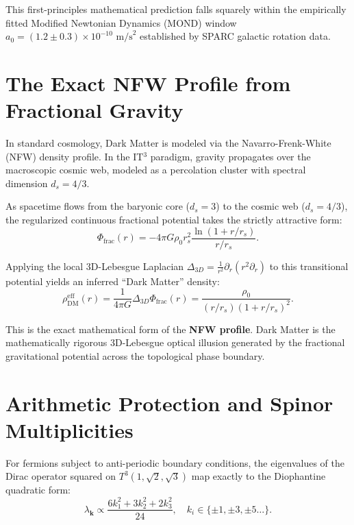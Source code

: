 \documentclass[12pt, a4paper]{article}
\begin{document}
This first-principles mathematical prediction falls squarely within the empirically fitted Modified Newtonian Dynamics (MOND) window $a_0 = (1.2 \pm 0.3) \times 10^{-10} \text{ m/s}^2$ established by SPARC galactic rotation data. 

\section{The Exact NFW Profile from Fractional Gravity}

In standard cosmology, Dark Matter is modeled via the Navarro-Frenk-White (NFW) density profile. In the IT$^3$ paradigm, gravity propagates over the macroscopic cosmic web, modeled as a percolation cluster with spectral dimension $d_s = 4/3$. 

As spacetime flows from the baryonic core ($d_s=3$) to the cosmic web ($d_s=4/3$), the regularized continuous fractional potential takes the strictly attractive form:
\begin{equation}
\Phi_{\text{frac}}(r) = -4\pi G \rho_0 r_s^2 \frac{\ln(1 + r/r_s)}{r/r_s}.
\end{equation}

Applying the local 3D-Lebesgue Laplacian $\Delta_{3D} = \frac{1}{r^2} \partial_r (r^2 \partial_r)$ to this transitional potential yields an inferred ``Dark Matter'' density:
\begin{equation}
\rho_{\text{DM}}^{\text{eff}}(r) = \frac{1}{4\pi G} \Delta_{3D} \Phi_{\text{frac}}(r) = \frac{\rho_0}{(r/r_s)(1 + r/r_s)^2}.
\end{equation}

This is the exact mathematical form of the \textbf{NFW profile}. Dark Matter is the mathematically rigorous 3D-Lebesgue optical illusion generated by the fractional gravitational potential across the topological phase boundary.

\section{Arithmetic Protection and Spinor Multiplicities}

For fermions subject to anti-periodic boundary conditions, the eigenvalues of the Dirac operator squared on $T^3(1,\sqrt{2},\sqrt{3})$ map exactly to the Diophantine quadratic form:
\begin{equation}
\lambda_{\mathbf{k}} \propto \frac{6k_1^2 + 3k_2^2 + 2k_3^2}{24}, \quad k_i \in \{ \pm 1, \pm 3, \pm 5 \dots \}.
\end{equation}
\end{document}
